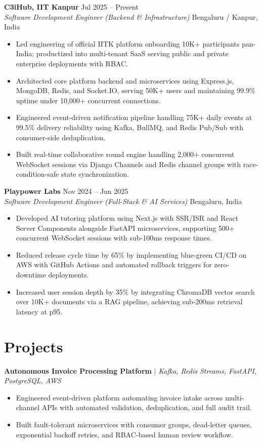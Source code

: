 \documentclass[10pt]{article}
\newcommand{\rItemList}{\begin{itemize}[leftmargin=1.1em, itemsep=0.8pt, topsep=0.8pt, parsep=0pt, label=\textbullet]}
\newcommand{\rEndItemList}{\end{itemize}}
\begin{document}
\textbf{C3iHub, IIT Kanpur} \hfill Jul 2025 -- Present \\
\textit{Software Development Engineer (Backend \& Infrastructure)} \hfill Bengaluru / Kanpur, India
\rItemList
\item Led engineering of official IITK platform onboarding 10K+ participants pan-India; productized into multi-tenant SaaS serving public and private enterprise deployments with RBAC.
\item Architected core platform backend and microservices using Express.js, MongoDB, Redis, and Socket.IO, serving 50K+ users and maintaining 99.9\% uptime under 10,000+ concurrent connections.
\item Engineered event-driven notification pipeline handling 75K+ daily events at 99.5\% delivery reliability using Kafka, BullMQ, and Redis Pub/Sub with consumer-side deduplication.
\item Built real-time collaborative round engine handling 2,000+ concurrent WebSocket sessions via Django Channels and Redis channel groups with race-condition-safe state synchronization.
\rEndItemList

\textbf{Playpower Labs} \hfill Nov 2024 -- Jun 2025 \\
\textit{Software Development Engineer (Full-Stack \& AI Services)} \hfill Bengaluru, India
\rItemList
\item Developed AI tutoring platform using Next.js with SSR/ISR and React Server Components alongside FastAPI microservices, supporting 500+ concurrent WebSocket sessions with sub-100ms response times.
\item Reduced release cycle time by 65\% by implementing blue-green CI/CD on AWS with GitHub Actions and automated rollback triggers for zero-downtime deployments.
\item Increased user session depth by 35\% by integrating ChromaDB vector search over 10K+ documents via a RAG pipeline, achieving sub-200ms retrieval latency at p95.
\rEndItemList

\section{Projects}

\textbf{Autonomous Invoice Processing Platform} $\vert$ \textit{Kafka, Redis Streams, FastAPI, PostgreSQL, AWS} \\
\rItemList
\item Engineered event-driven platform automating invoice intake across multi-channel APIs with automated validation, deduplication, and full audit trail.
\item Built fault-tolerant microservices with consumer groups, dead-letter queues, exponential backoff retries, and RBAC-based human review workflow.
\rEndItemList
\end{document}
